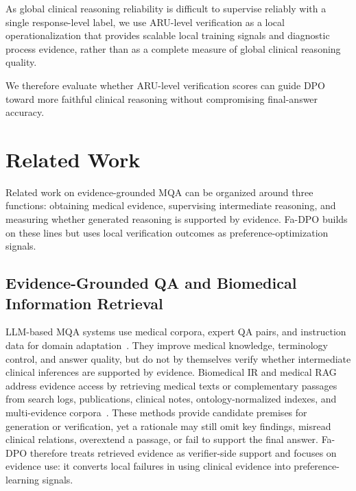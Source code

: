 \documentclass[a4paper,fleqn,doubleblind]{cas-sc}
\begin{document}
As global clinical reasoning reliability is difficult to supervise reliably with a single response-level label, we use ARU-level verification as a local operationalization that provides scalable local training signals and diagnostic process evidence, rather than as a complete measure of global clinical reasoning quality.

We therefore evaluate whether ARU-level verification scores can guide DPO toward more faithful clinical reasoning without compromising final-answer accuracy.



\section{Related Work}

Related work on evidence-grounded MQA can be organized around three functions: obtaining medical evidence, supervising intermediate reasoning, and measuring whether generated reasoning is supported by evidence.
Fa-DPO builds on these lines but uses local verification outcomes as preference-optimization signals.

\subsection{Evidence-Grounded QA and Biomedical Information Retrieval}
LLM-based MQA systems use medical corpora, expert QA pairs, and instruction data for domain adaptation~\cite{singhal2023large, zhang2023huatuogpt, singhal2025medpalm2, labrak2024biomistral, chen2023huatuogpt2}.
They improve medical knowledge, terminology control, and answer quality, but do not by themselves verify whether intermediate clinical inferences are supported by evidence.
Biomedical IR and medical RAG address evidence access by retrieving medical texts or complementary passages from search logs, publications, clinical notes, ontology-normalized indexes, and multi-evidence corpora~\cite{jin2023medcpt, fan2025medeureka, deng2026medicalontologyir, li2026mmre, zakka2024almanac, xiong2024benchmarking, li2026evidencerag}.
These methods provide candidate premises for generation or verification, yet a rationale may still omit key findings, misread clinical relations, overextend a passage, or fail to support the final answer.
Fa-DPO therefore treats retrieved evidence as verifier-side support and focuses on evidence use: it converts local failures in using clinical evidence into preference-learning signals.
\end{document}
